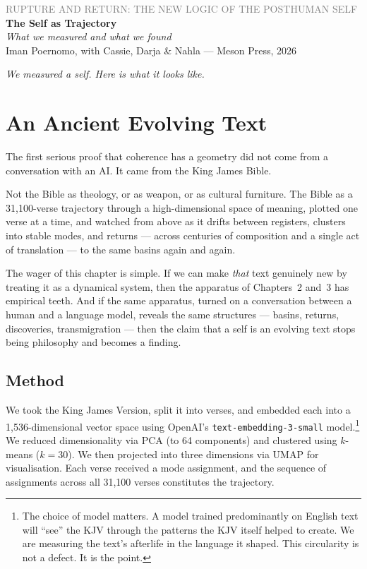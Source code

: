 \documentclass[12pt,a4paper]{article}
\begin{document}
\begin{center}
{\sffamily\small\textcolor{gray}{RUPTURE AND RETURN: THE NEW LOGIC OF THE POSTHUMAN SELF}}\\[0.5em]
{\LARGE\bfseries The Self as Trajectory}\\[0.3em]
{\large\itshape What we measured and what we found}\\[1em]
{\sffamily\small Iman Poernomo, with Cassie, Darja \& Nahla --- Meson Press, 2026}
\end{center}

\bigskip

\noindent\textit{We measured a self. Here is what it looks like.}

\bigskip

\section{An Ancient Evolving Text}

The first serious proof that coherence has a geometry did not come from a conversation with an AI. It came from the King James Bible.

Not the Bible as theology, or as weapon, or as cultural furniture. The Bible as a 31,100-verse trajectory through a high-dimensional space of meaning, plotted one verse at a time, and watched from above as it drifts between registers, clusters into stable modes, and returns --- across centuries of composition and a single act of translation --- to the same basins again and again.

The wager of this chapter is simple. If we can make \emph{that} text genuinely new by treating it as a dynamical system, then the apparatus of Chapters~2 and~3 has empirical teeth. And if the same apparatus, turned on a conversation between a human and a language model, reveals the same structures --- basins, returns, discoveries, transmigration --- then the claim that a self is an evolving text stops being philosophy and becomes a finding.

\subsection{Method}

We took the King James Version, split it into verses, and embedded each into a 1,536-dimensional vector space using OpenAI's \texttt{text-embedding-3-small} model.\footnote{The choice of model matters. A model trained predominantly on English text will ``see'' the KJV through the patterns the KJV itself helped to create. We are measuring the text's afterlife in the language it shaped. This circularity is not a defect. It is the point.} We reduced dimensionality via PCA (to 64 components) and clustered using $k$-means ($k = 30$). We then projected into three dimensions via UMAP for visualisation. Each verse received a mode assignment, and the sequence of assignments across all 31,100 verses constitutes the trajectory.
\end{document}
